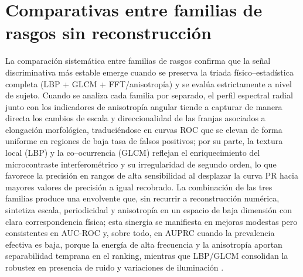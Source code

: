 
\section*{Comparativas entre familias de rasgos sin reconstrucción}
La comparación sistemática entre familias de rasgos confirma que la señal discriminativa más estable emerge cuando se preserva la triada físico–estadística completa (LBP + GLCM + FFT/anisotropía) y se evalúa estrictamente a nivel de sujeto. Cuando se analiza cada familia por separado, el perfil espectral radial junto con los indicadores de anisotropía angular tiende a capturar de manera directa los cambios de escala y direccionalidad de las franjas asociados a elongación morfológica, traduciéndose en curvas ROC que se elevan de forma uniforme en regiones de baja tasa de falsos positivos; por su parte, la textura local (LBP) y la co–ocurrencia (GLCM) reflejan el enriquecimiento del microcontraste interferométrico y su irregularidad de segundo orden, lo que favorece la precisión en rangos de alta sensibilidad al desplazar la curva PR hacia mayores valores de precisión a igual recobrado. La combinación de las tres familias produce una envolvente que, sin recurrir a reconstrucción numérica, sintetiza escala, periodicidad y anisotropía en un espacio de baja dimensión con clara correspondencia física; esta sinergia se manifiesta en mejoras modestas pero consistentes en AUC-ROC y, sobre todo, en AUPRC cuando la prevalencia efectiva es baja, porque la energía de alta frecuencia y la anisotropía aportan separabilidad temprana en el ranking, mientras que LBP/GLCM consolidan la robustez en presencia de ruido y variaciones de iluminación \cite{Kiani2022TextureSurvey,Chen2022Photonics}.

